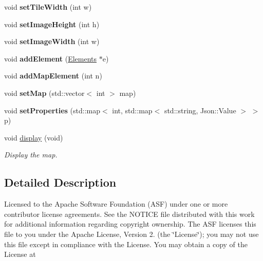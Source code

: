 \begin{DoxyCompactItemize}
\item 
\hypertarget{class_map_a88d4cda4b476ae4ee3487786b0feccd9}{void {\bfseries set\+Tile\+Width} (int w)}\label{class_map_a88d4cda4b476ae4ee3487786b0feccd9}

\item 
\hypertarget{class_map_ada51d21543808fa10d085c3c09bda7f9}{void {\bfseries set\+Image\+Height} (int h)}\label{class_map_ada51d21543808fa10d085c3c09bda7f9}

\item 
\hypertarget{class_map_a38f4a514bf3993ef816b6feda56ab36e}{void {\bfseries set\+Image\+Width} (int w)}\label{class_map_a38f4a514bf3993ef816b6feda56ab36e}

\item 
\hypertarget{class_map_a8b3a39287db471b6faec3cfb281b2da6}{void {\bfseries add\+Element} (\hyperlink{class_elements}{Elements} $\ast$e)}\label{class_map_a8b3a39287db471b6faec3cfb281b2da6}

\item 
\hypertarget{class_map_a4352368e79238539142cf1397c992c65}{void {\bfseries add\+Map\+Element} (int n)}\label{class_map_a4352368e79238539142cf1397c992c65}

\item 
\hypertarget{class_map_a6a1130ac8c3c4d6dcf636759aa970b9b}{void {\bfseries set\+Map} (std\+::vector$<$ int $>$ map)}\label{class_map_a6a1130ac8c3c4d6dcf636759aa970b9b}

\item 
\hypertarget{class_map_a391c92153c0a6134bec05ae442d4fff0}{void {\bfseries set\+Properties} (std\+::map$<$ int, std\+::map$<$ std\+::string, Json\+::\+Value $>$ $>$ p)}\label{class_map_a391c92153c0a6134bec05ae442d4fff0}

\item 
void \hyperlink{class_map_aba8bab272a45054368279643d75fa3ba}{display} (void)
\begin{DoxyCompactList}\small\item\em Display the map. \end{DoxyCompactList}\end{DoxyCompactItemize}


\subsection{Detailed Description}
Licensed to the Apache Software Foundation (A\+S\+F) under one or more contributor license agreements. See the N\+O\+T\+I\+C\+E file distributed with this work for additional information regarding copyright ownership. The A\+S\+F licenses this file to you under the Apache License, Version 2. (the \char`\"{}\+License\char`\"{}); you may not use this file except in compliance with the License. You may obtain a copy of the License at

